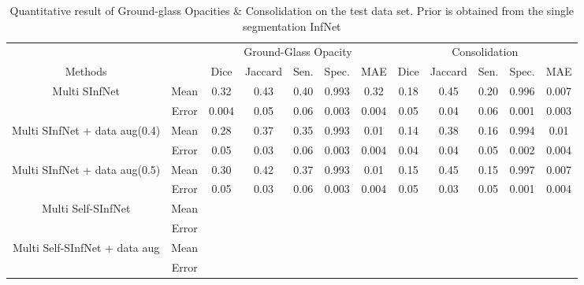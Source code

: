 \begin{table}[!h]
	\centering
	\begin{tabular}{| c | c || c c c c c || c c c c c |}
		\hline
		& &\multicolumn{5}{c||}{Ground-Glass Opacity} & \multicolumn{5}{c|}{Consolidation}\\ \cline{3-12}
		Methods & & Dice & Jaccard & Sen. & Spec. & MAE & Dice & Jaccard & Sen. & Spec. & MAE \\\hline
		Multi SInfNet & Mean & 0.32 & 0.43 & 0.40 & 0.993 & 0.32 & 0.18 & 0.45  & 0.20 & 0.996 & 0.007  \\ \cline{2-12}
		& Error & 0.004 & 0.05 & 0.06 & 0.003 & 0.004 & 0.05 & 0.04 & 0.06 & 0.001 & 0.003 \\ \hline \hline
		
		Multi SInfNet + data aug(0.4) & Mean & 0.28 & 0.37 & 0.35 & 0.993 & 0.01 & 0.14 & 0.38 & 0.16 & 0.994 & 0.01  \\ \cline{2-12}
		& Error & 0.05 & 0.03 & 0.06 & 0.003 & 0.004 & 0.04 & 0.04 & 0.05 & 0.002 & 0.004  \\ \hline \hline
		
		Multi SInfNet + data aug(0.5) & Mean & 0.30 & 0.42 & 0.37 & 0.993 & 0.01 & 0.15 & 0.45 & 0.15 & 0.997 & 0.007  \\ \cline{2-12}
		& Error & 0.05 & 0.03 & 0.06 & 0.003 & 0.004 & 0.05 & 0.03 & 0.05 & 0.001 & 0.004  \\ \hline \hline
		
		Multi Self-SInfNet & Mean & & & & & & & & & &  \\ \cline{2-12}
		& Error & & & & & & & & & &  \\ \hline \hline
		
		Multi Self-SInfNet + data aug & Mean & & & & & & & & & &  \\ \cline{2-12}
		& Error & & & & & & & & & &  \\ \hline \hline
	\end{tabular}
	\caption{Quantitative result of Ground-glass Opacities \& Consolidation on the test data set. Prior is obtained from the single segmentation InfNet}
	\label{tab:multi-weakprior}
\end{table}

